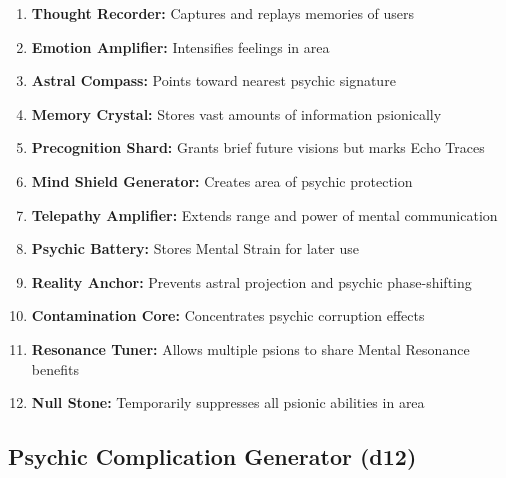 \documentclass[11pt,twoside]{article}
\begin{document}
\begin{enumerate}[leftmargin=*]
    \item \textbf{Thought Recorder:} Captures and replays memories of users
    \item \textbf{Emotion Amplifier:} Intensifies feelings in area
    \item \textbf{Astral Compass:} Points toward nearest psychic signature
    \item \textbf{Memory Crystal:} Stores vast amounts of information psionically
    \item \textbf{Precognition Shard:} Grants brief future visions but marks Echo Traces
    \item \textbf{Mind Shield Generator:} Creates area of psychic protection
    \item \textbf{Telepathy Amplifier:} Extends range and power of mental communication
    \item \textbf{Psychic Battery:} Stores Mental Strain for later use
    \item \textbf{Reality Anchor:} Prevents astral projection and psychic phase-shifting
    \item \textbf{Contamination Core:} Concentrates psychic corruption effects
    \item \textbf{Resonance Tuner:} Allows multiple psions to share Mental Resonance benefits
    \item \textbf{Null Stone:} Temporarily suppresses all psionic abilities in area
\end{enumerate}

\subsection{Psychic Complication Generator (d12)}
\end{document}
